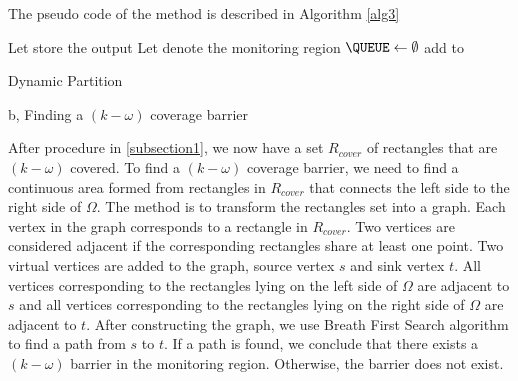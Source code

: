 The pseudo code of the method is described in Algorithm \ref{alg3}
%

%
\begin{center}
	\begin{minipage}{.7\linewidth}
		\begin{algorithm}[H]
			\DontPrintSemicolon
			\SetAlgoLined
			\newcommand{\forcondi}[2]{\ensuremath{#1 \in #2}}
			\BlankLine
			\BlankLine
			\BlankLine
			Let \coveredNodes store the output\;
			Let \root denote the monitoring region\;
			$\QUEUE\gets\emptyset$\;
			add \root to \QUEUE \;
			\caption{Dynamic Partition}
			\label{alg3}
		\end{algorithm}
	\end{minipage}
\end{center}

b, Finding a $(k-\omega)$ coverage barrier

After procedure in \ref{subsection1}, we now have a set $ R_{cover} $ of rectangles that are $(k-\omega)$ covered. To find a $(k-\omega)$ coverage barrier, we need to find a continuous area formed from rectangles in $R_{cover}$ that connects the left side to the right side of $\Omega$. The method is to transform the rectangles set into a graph. Each vertex in the graph corresponds to a rectangle in $ R_{cover} $. Two vertices are considered adjacent if the corresponding rectangles share at least one point. Two virtual vertices are added to the graph, source vertex $ s $ and sink vertex $ t $. All vertices corresponding to the rectangles lying on the left side of $\Omega$ are adjacent to $s$ and all vertices corresponding to the rectangles lying on the right side of $\Omega$ are adjacent to $t$. After constructing the graph, we use Breath First Search algorithm to find a path from $s$ to $t$. If a path is found, we conclude that there exists a $(k-\omega)$ barrier in the monitoring region. Otherwise, the barrier does not exist.